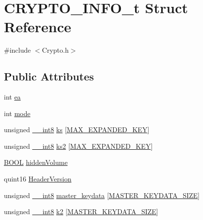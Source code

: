 \hypertarget{struct_c_r_y_p_t_o___i_n_f_o__t}{}\section{C\+R\+Y\+P\+T\+O\+\_\+\+I\+N\+F\+O\+\_\+t Struct Reference}
\label{struct_c_r_y_p_t_o___i_n_f_o__t}


{\ttfamily \#include $<$Crypto.\+h$>$}

\subsection*{Public Attributes}
\begin{DoxyCompactItemize}
\item 
int \hyperlink{struct_c_r_y_p_t_o___i_n_f_o__t_a769b0843f4a93380062b5a7b153e75eb}{ea}
\item 
int \hyperlink{struct_c_r_y_p_t_o___i_n_f_o__t_a2ca1b8c5380da4446e4780d52f5c18ec}{mode}
\item 
unsigned \hyperlink{_gstdefs_8h_a040b30765a23a94d40af4f00f956c3a5}{\+\_\+\+\_\+int8} \hyperlink{struct_c_r_y_p_t_o___i_n_f_o__t_a20f1184d88625a83511781bf6b27168f}{ks} \mbox{[}\hyperlink{_crypto_8h_ada56882b07c27e391b81a014a85761ce}{M\+A\+X\+\_\+\+E\+X\+P\+A\+N\+D\+E\+D\+\_\+\+K\+EY}\mbox{]}
\item 
unsigned \hyperlink{_gstdefs_8h_a040b30765a23a94d40af4f00f956c3a5}{\+\_\+\+\_\+int8} \hyperlink{struct_c_r_y_p_t_o___i_n_f_o__t_a5131a605efc7b27a6760dffbca062554}{ks2} \mbox{[}\hyperlink{_crypto_8h_ada56882b07c27e391b81a014a85761ce}{M\+A\+X\+\_\+\+E\+X\+P\+A\+N\+D\+E\+D\+\_\+\+K\+EY}\mbox{]}
\item 
\hyperlink{_gstdefs_8h_ae4cc35dcc70810fa972cc8a5185a28fa}{B\+O\+OL} \hyperlink{struct_c_r_y_p_t_o___i_n_f_o__t_a05f73ded370dd50c5ea9ec4cc48c7f64}{hidden\+Volume}
\item 
quint16 \hyperlink{struct_c_r_y_p_t_o___i_n_f_o__t_a39a20b5cbadd34bd70bf090f98715aff}{Header\+Version}
\item 
unsigned \hyperlink{_gstdefs_8h_a040b30765a23a94d40af4f00f956c3a5}{\+\_\+\+\_\+int8} \hyperlink{struct_c_r_y_p_t_o___i_n_f_o__t_a3ed5d4caeac87ba4b4153851985660fc}{master\+\_\+keydata} \mbox{[}\hyperlink{_crypto_8h_a4f76a109cfa790caf13588bb8d8e24ca}{M\+A\+S\+T\+E\+R\+\_\+\+K\+E\+Y\+D\+A\+T\+A\+\_\+\+S\+I\+ZE}\mbox{]}
\item 
unsigned \hyperlink{_gstdefs_8h_a040b30765a23a94d40af4f00f956c3a5}{\+\_\+\+\_\+int8} \hyperlink{struct_c_r_y_p_t_o___i_n_f_o__t_ab3efb9f55ae931fa713c104170288372}{k2} \mbox{[}\hyperlink{_crypto_8h_a4f76a109cfa790caf13588bb8d8e24ca}{M\+A\+S\+T\+E\+R\+\_\+\+K\+E\+Y\+D\+A\+T\+A\+\_\+\+S\+I\+ZE}\mbox{]}

\end{DoxyCompactItemize}
